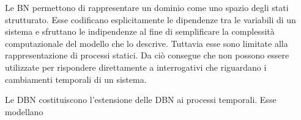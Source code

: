 Le \acf{BN}
\citep{Pearl1988}
permettono di rappresentare un dominio come uno spazio degli stati strutturato.
Esse codificano esplicitamente le dipendenze tra le variabili di un sistema e sfruttano le indipendenze al fine di semplificare la complessità computazionale del modello che lo descrive.
Tuttavia esse sono limitate alla rappresentazione di processi statici.
Da ciò consegue che non possono essere utilizzate per rispondere direttamente a interrogativi che riguardano i cambiamenti temporali di un sistema.

Le \acf{DBN}
\citep{Dean1989}
costituiscono l'estensione delle \acf{DBN} ai processi temporali.
Esse modellano



